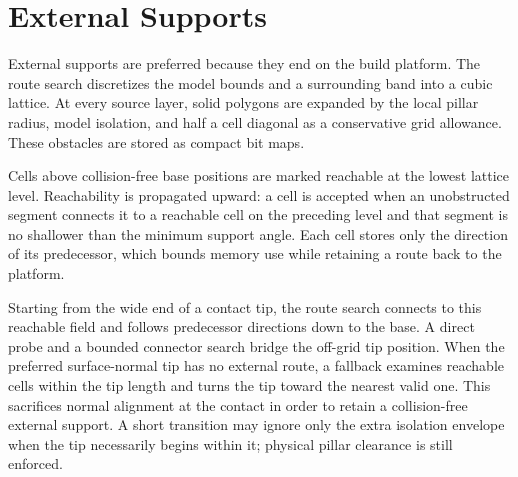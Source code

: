 \section{External Supports}

External supports are preferred because they end on the build platform. The
route search discretizes the model bounds and a surrounding band into a cubic
lattice. At every source layer, solid polygons are expanded by the local
pillar radius, model isolation, and half a cell diagonal as a conservative
grid allowance. These obstacles are stored as compact bit maps.

Cells above collision-free base positions are marked reachable at the lowest
lattice level. Reachability is propagated upward: a cell is accepted when an
unobstructed segment connects it to a reachable cell on the preceding level
and that segment is no shallower than the minimum support angle. Each cell
stores only the direction of its predecessor, which bounds memory use while
retaining a route back to the platform.

Starting from the wide end of a contact tip, the route search connects to this
reachable field and follows predecessor directions down to the base. A direct
probe and a bounded connector search bridge the off-grid tip position. When
the preferred surface-normal tip has no external route, a fallback examines
reachable cells within the tip length and turns the tip toward the nearest
valid one. This sacrifices normal alignment at the contact in order to retain
a collision-free external support. A short transition may ignore only the
extra isolation envelope when the tip necessarily begins within it; physical
pillar clearance is still enforced.

